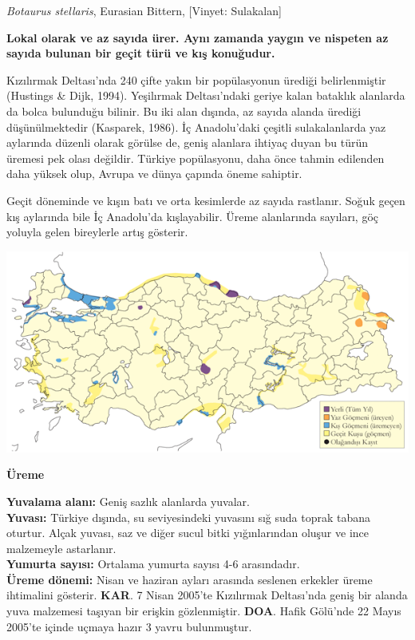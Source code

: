 \documentclass[
  a4paper,
  DIV=11,
  numbers=noendperiod]{scrreprt}
\begin{document}
\emph{Botaurus stellaris}, Eurasian Bittern, {[}Vinyet: Sulakalan{]}

\textbf{Lokal olarak ve az sayıda ürer. Aynı zamanda yaygın ve nispeten
az sayıda bulunan bir geçit türü ve kış konuğudur.}

Kızılırmak Deltası'nda 240 çifte yakın bir popülasyonun ürediği
belirlenmiştir (Hustings \& Dijk, 1994). Yeşilırmak Deltası'ndaki geriye
kalan bataklık alanlarda da bolca bulunduğu bilinir. Bu iki alan
dışında, az sayıda alanda ürediği düşünülmektedir (Kasparek, 1986). İç
Anadolu'daki çeşitli sulakalanlarda yaz aylarında düzenli olarak görülse
de, geniş alanlara ihtiyaç duyan bu türün üremesi pek olası değildir.
Türkiye popülasyonu, daha önce tahmin edilenden daha yüksek olup, Avrupa
ve dünya çapında öneme sahiptir.

Geçit döneminde ve kışın batı ve orta kesimlerde az sayıda rastlanır.
Soğuk geçen kış aylarında bile İç Anadolu'da kışlayabilir. Üreme
alanlarında sayıları, göç yoluyla gelen bireylerle artış gösterir.

\includegraphics{images/harita_Page_064.png}

\textbf{Üreme}

\textbf{Yuvalama alanı:} Geniş sazlık alanlarda yuvalar.\\
\textbf{Yuvası:} Türkiye dışında, su seviyesindeki yuvasını sığ suda
toprak tabana oturtur. Alçak yuvası, saz ve diğer sucul bitki
yığınlarından oluşur ve ince malzemeyle astarlanır.\\
\textbf{Yumurta sayısı:} Ortalama yumurta sayısı 4-6 arasındadır.\\
\textbf{Üreme dönemi:} Nisan ve haziran ayları arasında seslenen
erkekler üreme ihtimalini gösterir. \textbf{KAR}. 7 Nisan 2005'te
Kızılırmak Deltası'nda geniş bir alanda yuva malzemesi taşıyan bir
erişkin gözlenmiştir. \textbf{DOA}. Hafik Gölü'nde 22 Mayıs 2005'te
içinde uçmaya hazır 3 yavru bulunmuştur.
\end{document}
